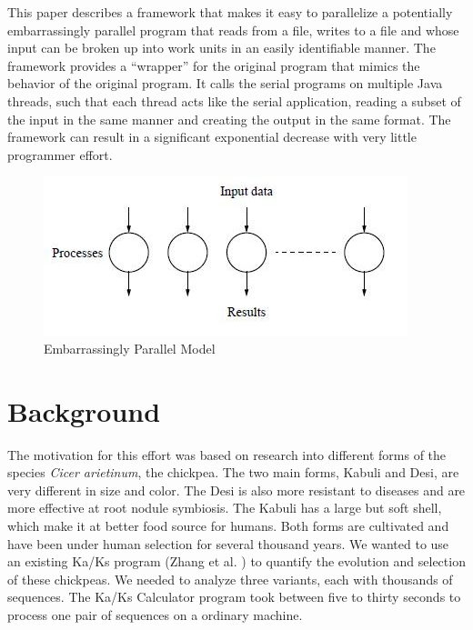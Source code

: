 \documentclass[12pt]{article}
\begin{document}
This paper describes a framework that makes it easy to parallelize a potentially
embarrassingly parallel program that reads from a file, writes to a file and
whose input can be broken up into work units in an easily identifiable manner.
The framework provides a ``wrapper'' for the original program that mimics the
behavior of the original program. It calls the serial programs on multiple Java
threads, such that each thread acts like the serial application, reading a
subset of the input in the same manner and creating the output in the same
format. The framework can result in a significant exponential decrease with very
little programmer effort. 

\begin{figure}
    \begin{center}
        \includegraphics{figures/ep.jpg}
    \end{center}
    \caption{Embarrassingly Parallel Model}
    \label{fig:ep}
\end{figure}

\section{Background}

The motivation for this effort was based on research into different forms of the
species \emph{Cicer arietinum}, the chickpea. The two main forms, Kabuli and
Desi, are very different in size and color. The Desi is also more resistant to
diseases and are more effective at root nodule symbiosis. The Kabuli has a large
but soft shell, which make it at better food source for humans. Both forms are
cultivated and have been under human selection for several thousand years. We
wanted to use an existing Ka/Ks program (Zhang et al. \cite{kaks}) to quantify
the evolution and selection of these chickpeas. We needed to analyze three
variants, each with thousands of sequences. The Ka/Ks Calculator program took
between five to thirty seconds to process one pair of sequences on a ordinary
machine.
\end{document}
